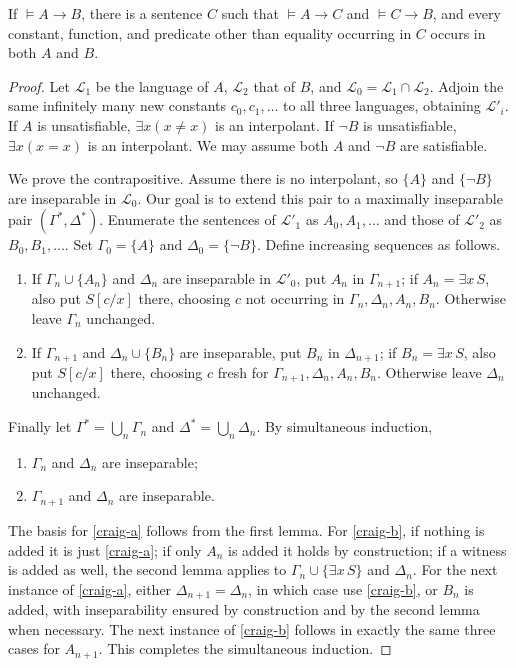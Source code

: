 \begin{theorem}
If $\models A\to B$, there is a sentence $C$ such that
$\models A\to C$ and $\models C\to B$, and every constant, function,
and predicate other than equality occurring in $C$ occurs in both $A$
and $B$.
\end{theorem}
\begin{proof}
Let $\mathcal L_1$ be the language of $A$, $\mathcal L_2$ that of $B$,
and $\mathcal L_0=\mathcal L_1\cap\mathcal L_2$. Adjoin the same infinitely
many new constants $c_0,c_1,\ldots$ to all three languages, obtaining
$\mathcal L'_i$.
If $A$ is unsatisfiable, $\exists x(x\ne x)$ is an interpolant.
If $\neg B$ is unsatisfiable, $\exists x(x=x)$ is an interpolant.
We may assume both $A$ and $\neg B$ are satisfiable.

We prove the contrapositive. Assume there is no interpolant, so
$\{A\}$ and $\{\neg B\}$ are inseparable in $\mathcal L_0$.
Our goal is to extend this pair to a maximally inseparable pair
$(\Gamma^*,\Delta^*)$.
Enumerate the sentences of $\mathcal L'_1$ as $A_0,A_1,\ldots$ and those
of $\mathcal L'_2$ as $B_0,B_1,\ldots$.
Set $\Gamma_0=\{A\}$ and $\Delta_0=\{\neg B\}$.
Define increasing sequences as follows.
\begin{enumerate}
\item If $\Gamma_n\cup\{A_n\}$ and $\Delta_n$ are inseparable in
$\mathcal L'_0$, put $A_n$ in $\Gamma_{n+1}$; if $A_n=\exists x\,S$,
also put $S[c/x]$ there, choosing $c$ not occurring in
$\Gamma_n,\Delta_n,A_n,B_n$. Otherwise leave $\Gamma_n$ unchanged.
\item If $\Gamma_{n+1}$ and $\Delta_n\cup\{B_n\}$ are inseparable,
put $B_n$ in $\Delta_{n+1}$; if $B_n=\exists x\,S$, also put
$S[c/x]$ there, choosing $c$ fresh for
$\Gamma_{n+1},\Delta_n,A_n,B_n$. Otherwise leave $\Delta_n$ unchanged.
\end{enumerate}
Finally let $\Gamma^*=\bigcup_n\Gamma_n$ and
$\Delta^*=\bigcup_n\Delta_n$.
By simultaneous induction,
\begin{enumerate}[label=(\alph*)]
\item\label{craig-a} $\Gamma_n$ and $\Delta_n$ are inseparable;
\item\label{craig-b} $\Gamma_{n+1}$ and $\Delta_n$ are inseparable.
\end{enumerate}
The basis for \ref{craig-a} follows from the first lemma. For
\ref{craig-b}, if nothing is added it is just \ref{craig-a}; if only
$A_n$ is added it holds by construction; if a witness is added as well,
the second lemma applies to $\Gamma_n\cup\{\exists x\,S\}$ and $\Delta_n$.
For the next instance of \ref{craig-a}, either $\Delta_{n+1}=\Delta_n$,
in which case use \ref{craig-b}, or $B_n$ is added, with inseparability
ensured by construction and by the second lemma when necessary.
The next instance of \ref{craig-b} follows in exactly the same three
cases for $A_{n+1}$. This completes the simultaneous induction.


\end{proof}
